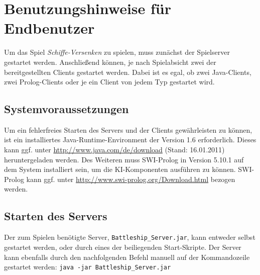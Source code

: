 \section{Benutzungshinweise für Endbenutzer} \label{sec:Endbenutzer}
	Um das Spiel \textit{Schiffe-Versenken} zu spielen, muss zunächst der Spielserver gestartet werden. Anschließend können, je nach
	Spielabsicht zwei der bereitgestellten Clients gestartet werden. Dabei ist es egal, ob zwei Java-Clients, zwei Prolog-Clients oder
	je ein Client von jedem Typ gestartet wird. 
	
	\subsection{Systemvoraussetzungen} %
	\label{sub:systemvoraussetzungen}
		Um ein fehlerfreies Starten des Servers und der Clients gewährleisten zu können, ist ein installiertes Java-Runtime-Environment 
		der Version 1.6 erforderlich. Dieses kann ggf. unter \url{http://www.java.com/de/download} (Stand: 16.01.2011) heruntergeladen werden.
		\newline
		Des Weiteren muss SWI-Prolog in Version 5.10.1 auf dem System installiert sein, um die KI-Komponenten ausführen zu können. SWI-Prolog 
		kann ggf. unter \url{http://www.swi-prolog.org/Download.html} bezogen werden.
	
\subsection{Starten des Servers}
	Der zum Spielen benötigte Server, \texttt{Battleship\_Server.jar}, kann entweder selbst gestartet werden, oder 
	durch eines der beiliegenden Start-Skripte.
	Der Server kann ebenfalls durch den nachfolgenden Befehl manuell auf der Kommandozeile gestartet werden: \newline
	\texttt{java -jar Battleship\_Server.jar}\newline

